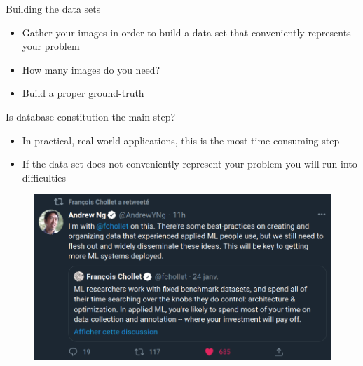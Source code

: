 \documentclass[xcolor=pdftex,dvipsnames,table,mathserif]{beamer}
\begin{document}
\begin{frame}{Building the data sets}
  \begin{itemize}
  \item Gather your images in order to build a data set that conveniently represents your problem
  \item How many images do you need?
  \item Build a proper ground-truth
  \end{itemize}

  \pause

  \begin{alertblock}{Is database constitution the main step?}
    \begin{itemize}
    \item In practical, real-world applications, this is the most time-consuming step
    \item If the data set does not conveniently represent your problem you will run into difficulties
    \end{itemize}

  \end{alertblock}

\end{frame}


\begin{frame}{}

  \begin{figure}[ht]
    \centering
    \includegraphics[width=\textwidth]{twitter_databases}
  \end{figure}


\end{frame}
\end{document}
